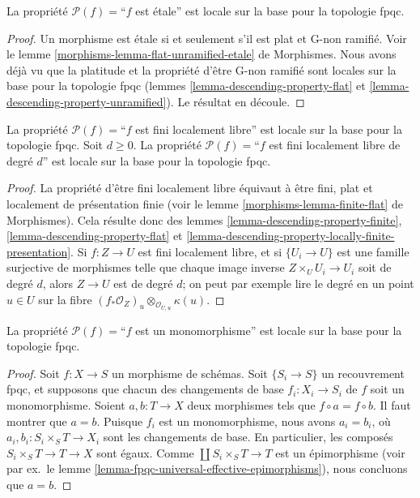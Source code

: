 \begin{lemma}
\label{lemma-descending-property-etale}
La propriété $\mathcal{P}(f) =$``$f$ est \'etale''
est locale sur la base pour la topologie fpqc.
\end{lemma}

\begin{proof}
Un morphisme est \'etale si et seulement s'il est plat et G-non ramifié.
Voir le lemme \ref{morphisms-lemma-flat-unramified-etale} de Morphismes.
Nous avons déjà vu que la platitude et la propriété d'être G-non ramifié
sont locales sur la base pour la topologie fpqc (lemmes
\ref{lemma-descending-property-flat} et
\ref{lemma-descending-property-unramified}).
Le résultat en découle.
\end{proof}

\begin{lemma}
\label{lemma-descending-property-finite-locally-free}
La propriété $\mathcal{P}(f) =$``$f$ est fini localement libre''
est locale sur la base pour la topologie fpqc.
Soit $d \geq 0$.
La propriété $\mathcal{P}(f) =$``$f$ est fini localement libre de degré $d$''
est locale sur la base pour la topologie fpqc.
\end{lemma}

\begin{proof}
La propriété d'être fini localement libre équivaut à être
fini, plat et localement de présentation finie
(voir le lemme \ref{morphisms-lemma-finite-flat} de Morphismes).
Cela résulte donc des lemmes
\ref{lemma-descending-property-finite},
\ref{lemma-descending-property-flat} et
\ref{lemma-descending-property-locally-finite-presentation}.
Si $f : Z \to U$ est fini localement libre, et si $\{U_i \to U\}$ est une
famille surjective de morphismes telle que chaque image inverse
$Z \times_U U_i \to U_i$ soit de degré $d$, alors $Z \to U$ est de degré $d$;
on peut par exemple lire le degré en un point $u \in U$ sur la fibre
$(f_*\mathcal{O}_Z)_u \otimes_{\mathcal{O}_{U, u}} \kappa(u)$.
\end{proof}

\begin{lemma}
\label{lemma-descending-property-monomorphism}
La propriété $\mathcal{P}(f) =$``$f$ est un monomorphisme''
est locale sur la base pour la topologie fpqc.
\end{lemma}

\begin{proof}
Soit $f : X \to S$ un morphisme de schémas.
Soit $\{S_i \to S\}$ un recouvrement fpqc, et supposons que chacun des
changements de base $f_i : X_i \to S_i$ de $f$ soit un monomorphisme.
Soient $a, b : T \to X$ deux morphismes tels que
$f \circ a = f \circ b$. Il faut montrer que $a = b$.
Puisque $f_i$ est un monomorphisme, nous avons $a_i = b_i$, où
$a_i, b_i : S_i \times_S T \to X_i$ sont les changements de base.
En particulier, les composés
$S_i \times_S T \to T \to X$ sont égaux.
Comme $\coprod S_i \times_S T \to T$
est un épimorphisme (voir
par ex.\ le lemme \ref{lemma-fpqc-universal-effective-epimorphisms}),
nous concluons que $a = b$.
\end{proof}

